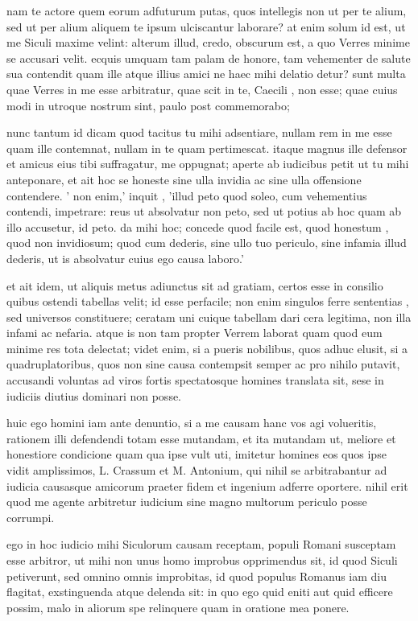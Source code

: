  nam te actore quem eorum adfuturum putas, quos intellegis non ut per te alium, sed ut per alium aliquem te ipsum ulciscantur laborare? at enim solum id est, ut me Siculi maxime velint: alterum illud, credo, obscurum est, a quo Verres minime se accusari velit. ecquis umquam tam palam de honore, tam vehementer de salute sua contendit quam ille atque illius amici ne haec mihi delatio detur? sunt multa quae Verres in me esse arbitratur, quae scit in te, Caecili , non esse; quae cuius modi in utroque nostrum sint, paulo post commemorabo;

 nunc tantum id dicam quod tacitus tu mihi adsentiare, nullam rem in me esse quam ille contemnat, nullam in te quam pertimescat. itaque magnus ille defensor et amicus eius tibi suffragatur, me oppugnat; aperte ab iudicibus petit ut tu mihi anteponare, et ait hoc se honeste sine ulla invidia ac sine ulla offensione contendere. ' non enim,' inquit , 'illud peto quod soleo, cum vehementius contendi, impetrare: reus ut absolvatur non peto, sed ut potius ab hoc quam ab illo accusetur, id peto. da mihi hoc; concede quod facile est, quod honestum , quod non invidiosum; quod cum dederis, sine ullo tuo periculo, sine infamia illud dederis, ut is absolvatur cuius ego causa laboro.'

 et ait idem, ut aliquis metus adiunctus sit ad gratiam, certos esse in consilio quibus ostendi tabellas velit; id esse perfacile; non enim singulos ferre sententias , sed universos constituere; ceratam uni cuique tabellam dari cera legitima, non illa infami ac nefaria. atque is non tam propter Verrem laborat quam quod eum minime res tota delectat; videt enim, si a pueris nobilibus, quos adhuc elusit, si a quadruplatoribus, quos non sine causa contempsit semper ac pro nihilo putavit, accusandi voluntas ad viros fortis spectatosque homines translata sit, sese in iudiciis diutius dominari non posse.

 huic ego homini iam ante denuntio, si a me causam hanc vos agi volueritis, rationem illi defendendi totam esse mutandam, et ita mutandam ut, meliore et honestiore condicione quam qua ipse vult uti, imitetur homines eos quos ipse vidit amplissimos, L. Crassum et M. Antonium, qui nihil se arbitrabantur ad iudicia causasque amicorum praeter fidem et ingenium adferre oportere. nihil erit quod me agente arbitretur iudicium sine magno multorum periculo posse corrumpi.

 ego in hoc iudicio mihi Siculorum causam receptam, populi Romani susceptam esse arbitror, ut mihi non unus homo improbus opprimendus sit, id quod Siculi petiverunt, sed omnino omnis improbitas, id quod populus Romanus iam diu flagitat, exstinguenda atque delenda sit: in quo ego quid eniti aut quid efficere possim, malo in aliorum spe relinquere quam in oratione mea ponere.

